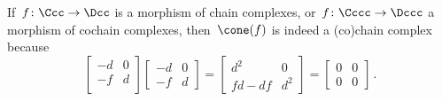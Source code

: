 \begin{remark}
  If~$f \colon \Ccc \to \Dcc$ is a morphism of chain complexes, or~$f \colon \Cccc \to \Dccc$ a morphism of cochain complexes, then~$\cone(f)$ is indeed a (co)chain complex because
  \[
      \begin{bmatrix}
        -d  & 0 \\
        -f  & d \\
      \end{bmatrix}
      \begin{bmatrix}
        -d  & 0 \\
        -f  & d
      \end{bmatrix}
    = \begin{bmatrix}
        d^2    & 0   \\
        fd-df  & d^2
      \end{bmatrix}
    = \begin{bmatrix}
        0 & 0 \\
        0 & 0
      \end{bmatrix} \,.
  \]
\end{remark}


